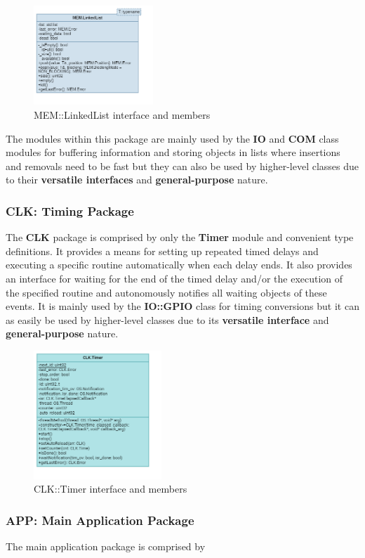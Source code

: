 \begin{figure}[H]
	\centering
	\includegraphics[width=0.4\textwidth]{./img/navig-class-linkedlist.png}
	\caption {MEM::LinkedList interface and members}
	\label{fig:navig-class-linkedlist}
	\end{figure}


The modules within this package are mainly used by the \textbf{IO} and \textbf{COM} class modules for buffering information and storing objects in lists where insertions and removals need to be fast but they can also be used by higher-level classes due to their \textbf{versatile interfaces} and \textbf{general-purpose} nature.



\subsubsection{CLK: Timing Package}

The \textbf{CLK} package is comprised by only the \textbf{Timer} module and convenient type definitions. It provides a means for setting up repeated timed delays and executing a specific routine automatically when each delay ends. It also provides an interface for waiting for the end of the timed delay and/or the execution of the specified routine and autonomously notifies all waiting objects of these events.
It is mainly used by the \textbf{IO::GPIO} class for timing conversions but it can as easily be used by higher-level classes due to its \textbf{versatile interface} and \textbf{general-purpose} nature.

\begin{figure}[H]
	\centering
	\includegraphics[width=0.43\textwidth]{./img/navig-class-timer.png}
	\caption {CLK::Timer interface and members}
	\label{fig:navig-class-timer}
	\end{figure}




\subsubsection{APP: Main Application Package}

The main application package is comprised by  

